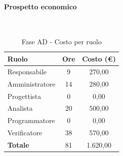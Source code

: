 \documentclass[../PianoProgetto.tex]{subfiles}
\begin{document}
\vfill
	
	\paragraph{Prospetto economico}\
	
					\begin{table}[H]
		\centering
	
		\begin{tabular}{l * {2}{c}}
			\toprule
			\textbf{Ruolo} & \textbf{Ore} & \textbf{Costo (\euro{})} \\
			\midrule
			Responsabile &	9 & 270,00 \\
			Amministratore & 14 & 280,00 \\
			Progettista & 0 & 0,00 \\
			Analista & 20 & 500,00 \\
			Programmatore & 0 & 0,00 \\
			Verificatore & 38 & 570,00 \\
			\midrule		
			\textbf{Totale} & 81 & 1.620,00 \\
			\bottomrule 
		\end{tabular}
		\caption{Fase AD - Costo per ruolo}
		\label{tab:faseAD_costo}
	\end{table}
\vfill
\newpage
	
\end{document}
